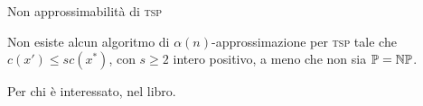 \begin{frame}{Non approssimabilità di \textsc{tsp}}

\vspace{-9pt}
\begin{myboxtitle}[Teorema]
Non esiste alcun algoritmo di $\alpha(n)$-approssimazione per 
\textsc{tsp} tale che $c(x') \le sc(x^*)$, con $s \geq 2$ intero positivo, a meno che non sia $\mathbb{P} = \mbox{$\mathbb{NP}$}$.
\end{myboxtitle}

\begin{myboxtitle}[Dimostrazione]
Per chi è interessato, nel libro.
\end{myboxtitle}
\end{frame}

%
%
%

